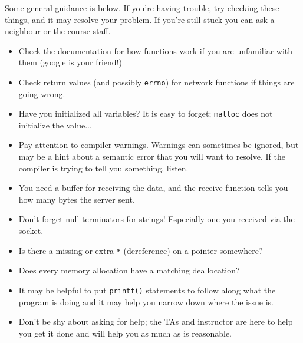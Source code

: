 Some general guidance is below. If you're having trouble, try checking these things, and it may resolve your problem. If you're still stuck you can ask a neighbour or the course staff.
\begin{itemize}
	\item Check the documentation for how functions work if you are unfamiliar with them (google is your friend!)
	\item Check return values (and possibly \texttt{errno}) for network functions if things are going wrong.  
	\item Have you initialized all variables? It is easy to forget; \texttt{malloc} does not initialize the value...
	\item Pay attention to compiler warnings. Warnings can sometimes be ignored, but may be a hint about a semantic error that you will want to resolve. If the compiler is trying to tell you something, listen.
	\item You need a buffer for receiving the data, and the receive function tells you how many bytes the server sent.
	\item Don't forget null terminators for strings! Especially one you received via the socket.
	\item Is there a missing or extra \texttt{*} (dereference) on a pointer somewhere?
	\item Does every memory allocation have a matching deallocation?
	\item It may be helpful to put \texttt{printf()} statements to follow along what the program is doing and it may help you narrow down where the issue is.
	\item Don't be shy about asking for help; the TAs and instructor are here to help you get it done and will help you as much as is reasonable.
\end{itemize}



